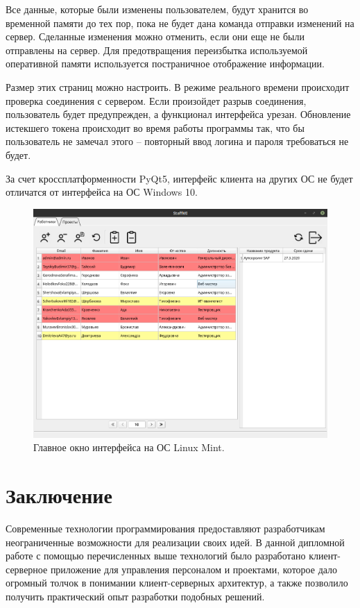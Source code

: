 \documentclass[14pt, a4paper]{extarticle}
\begin{document}
    Все данные, которые были изменены пользователем, будут хранится во временной памяти до тех пор, пока не будет дана команда отправки изменений на сервер. Сделанные изменения можно отменить, если они еще не были отправлены на сервер. Для предотвращения переизбытка используемой оперативной памяти используется постраничное отображение информации.

    Размер этих страниц можно настроить. В режиме реального времени происходит проверка соединения с сервером. Если произойдет разрыв соединения, пользователь будет предупрежден, а функционал интерфейса урезан. Обновление истекшего токена происходит во время работы программы так, что бы пользователь не замечал этого – повторный ввод логина и пароля требоваться не будет.

    За счет кроссплатформенности PyQt5, интерфейс клиента на других ОС не будет отличатся от интерфейса на ОС Windows 10.
    
    \begin{figure}[h]
        \centering
        \includegraphics[width=1\linewidth]{img/main_window_linux.png}
        \caption{Главное окно интерфейса на ОС Linux Mint.}
        \label{fig:main_window_linux}
    \end{figure}


    \clearpage
    \section{Заключение}
    Современные технологии программирования предоставляют разработчикам неограниченные возможности для реализации своих идей. В данной дипломной работе с помощью перечисленных выше технологий было разработано клиент-серверное приложение для управления персоналом и проектами, которое дало огромный толчок в понимании клиент-серверных архитектур, а также позволило получить практический опыт разработки подобных решений.
\end{document}
